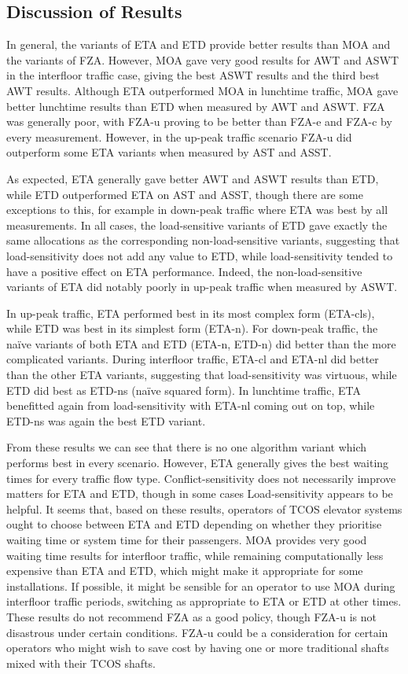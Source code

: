 \documentclass{UoYCSproject}
\begin{document}
\subsection{Discussion of Results}

In general, the variants of ETA and ETD provide better results than MOA and the variants of FZA.  However, MOA gave very good results for AWT and ASWT in the interfloor traffic case, giving the best ASWT results and the third best AWT results.  Although ETA outperformed MOA in lunchtime traffic, MOA gave better lunchtime results than ETD when measured by AWT and ASWT.  FZA was generally poor, with FZA-u proving to be better than FZA-e and FZA-c by every measurement.  However, in the up-peak traffic scenario FZA-u did outperform some ETA variants when measured by AST and ASST.

As expected, ETA generally gave better AWT and ASWT results than ETD, while ETD outperformed ETA on AST and ASST, though there are some exceptions to this, for example in down-peak traffic where ETA was best by all measurements.  In all cases, the load-sensitive variants of ETD gave exactly the same allocations as the corresponding non-load-sensitive variants, suggesting that load-sensitivity does not add any value to ETD, while load-sensitivity tended to have a positive effect on ETA performance.  Indeed, the non-load-sensitive variants of ETA did notably poorly in up-peak traffic when measured by ASWT.

In up-peak traffic, ETA performed best in its most complex form (ETA-cls), while ETD was best in its simplest form (ETA-n).  For down-peak traffic, the na\"{i}ve variants of both ETA and ETD (ETA-n, ETD-n) did better than the more complicated variants.  During interfloor traffic, ETA-cl and ETA-nl did better than the other ETA variants, suggesting that load-sensitivity was virtuous, while ETD did best as ETD-ns (na\"{i}ve squared form).  In lunchtime traffic, ETA benefitted again from load-sensitivity with ETA-nl coming out on top, while ETD-ns was again the best ETD variant.

From these results we can see that there is no one algorithm variant which performs best in every scenario.  However, ETA generally gives the best waiting times for every traffic flow type.  Conflict-sensitivity does not necessarily improve matters for ETA and ETD, though in some cases Load-sensitivity appears to be helpful.  It seems that, based on these results, operators of TCOS elevator systems ought to choose between ETA and ETD depending on whether they prioritise waiting time or system time for their passengers.  MOA provides very good waiting time results for interfloor traffic, while remaining computationally less expensive than ETA and ETD, which might make it appropriate for some installations.  If possible, it might be sensible for an operator to use MOA during interfloor traffic periods, switching as appropriate to ETA or ETD at other times.  These results do not recommend FZA as a good policy, though FZA-u is not disastrous under certain conditions.  FZA-u could be a consideration for certain operators who might wish to save cost by having one or more traditional shafts mixed with their TCOS shafts.
\end{document}
